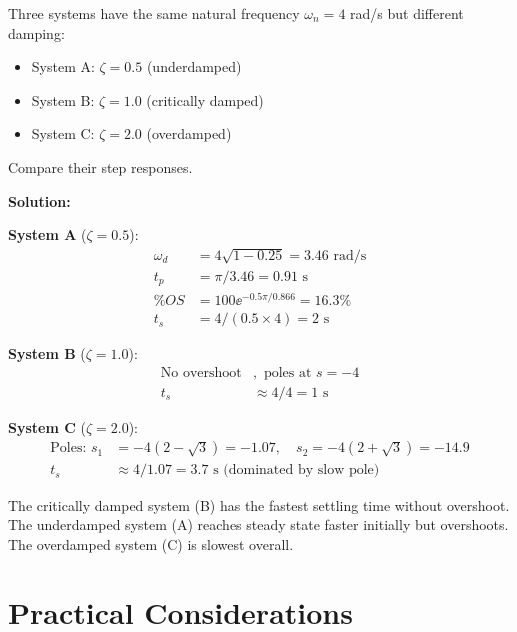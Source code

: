 \begin{examplebox}[title=Example 7.5: Comparing Damping Cases]
Three systems have the same natural frequency $\omega_n = 4$ rad/s but different damping:
\begin{itemize}
    \item System A: $\zeta = 0.5$ (underdamped)
    \item System B: $\zeta = 1.0$ (critically damped)
    \item System C: $\zeta = 2.0$ (overdamped)
\end{itemize}

Compare their step responses.

\textbf{Solution:}

\textbf{System A} ($\zeta = 0.5$):
\begin{align}
\omega_d &= 4\sqrt{1 - 0.25} = 3.46 \text{ rad/s} \\
t_p &= \pi/3.46 = 0.91 \text{ s} \\
\%OS &= 100\ee^{-0.5\pi/0.866} = 16.3\% \\
t_s &= 4/(0.5 \times 4) = 2 \text{ s}
\end{align}

\textbf{System B} ($\zeta = 1.0$):
\begin{align}
\text{No overshoot}&, \text{ poles at } s = -4 \\
t_s &\approx 4/4 = 1 \text{ s}
\end{align}

\textbf{System C} ($\zeta = 2.0$):
\begin{align}
\text{Poles: } s_1 &= -4(2 - \sqrt{3}) = -1.07, \quad s_2 = -4(2 + \sqrt{3}) = -14.9 \\
t_s &\approx 4/1.07 = 3.7 \text{ s (dominated by slow pole)}
\end{align}

The critically damped system (B) has the fastest settling time without overshoot. The underdamped system (A) reaches steady state faster initially but overshoots. The overdamped system (C) is slowest overall.
\end{examplebox}

\section{Practical Considerations}
\label{sec:practical}

